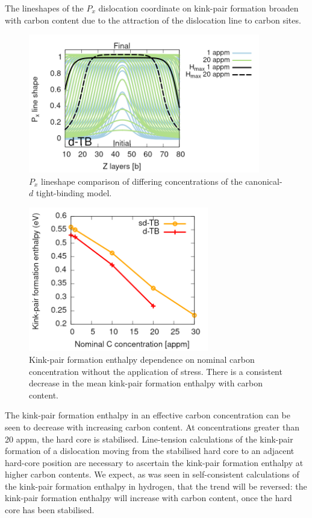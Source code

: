 \documentclass[a4paper,11pt]{article}
\numberwithin{equation}{chapter}
\numberwithin{listing}{chapter}
\begin{document}
The lineshapes of the \(P_x\) dislocation coordinate on kink-pair formation broaden with carbon
content due to the attraction of the dislocation line to carbon sites.

\begin{figure}[htbp]
\centering
\includegraphics[width=0.9\textwidth]{iron/Images/lineshapes_dtb_moving_sites_labelled18.png}
\caption{\(P_x\) lineshape comparison of differing concentrations of the canonical-\(d\) tight-binding model.}
\end{figure}


\begin{figure}[htbp]
\centering
\includegraphics[width=0.7\textwidth]{iron/Images/kink-pair_formation_equilibrium_sdtb_dtb_30appm.png}
\caption{Kink-pair formation enthalpy dependence on nominal carbon concentration without the application of stress. There is a consistent decrease in the mean kink-pair formation enthalpy with carbon content.}
\end{figure}

The kink-pair formation enthalpy in an effective carbon concentration can be
seen to decrease with increasing carbon content. At concentrations greater
than 20 appm, the hard core is stabilised. Line-tension calculations of the
kink-pair formation of a dislocation moving from the stabilised hard
core to an adjacent hard-core position are necessary to ascertain the
kink-pair formation enthalpy at higher carbon contents. We expect, as
was seen in self-consistent calculations of the kink-pair formation enthalpy
in hydrogen, that the trend will be reversed: the kink-pair formation
enthalpy will increase with carbon content, once the hard core has been stabilised.
\end{document}
